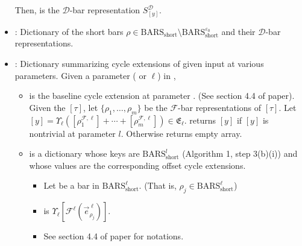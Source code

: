 \documentclass{article}
\begin{document}
\begin{itemize}
Then,  is the $\mathcal{D}$-bar representation $S^{\mathcal{D}}_{[y]}$.
\item {}: Dictionary of the short bars $\rho \in \text{BARS}_{\text{short}} \setminus \text{BARS}_{\text{short}}^{\varepsilon_0}$ and their $\mathcal{D}$-bar representations.
\item {}: Dictionary summarizing cycle extensions of given input at various parameters.  Given a parameter  ( or $\ell$) in , 

	\begin{itemize}
	\item {} is the baseline cycle extension at parameter . (See section 4.4 of paper). Given the  $[\tau]$, let $\{ \rho_1, \dots, \rho_m \}$ be the $\mathcal{F}$-bar representations of $[\tau]$. Let $[y] = \Upsilon_{\ell}([\rho_1^{\mathcal{F}, \ell}] + \cdots + [\rho_m^{\mathcal{F}, \ell}]) \in \mathfrak{E}_{\ell}$.  returns $[y]$ if $[y]$ is nontrivial at parameter $l$. Otherwise returns empty array.
	\item {} is a dictionary whose keys are $\text{BARS}_{\text{short}}^{l}$ (Algorithm 1, step 3(b)(i)) and whose values are the corresponding offset cycle extensions.
	\begin{itemize}
	\item Let   be a bar in $\text{BARS}_{\text{short}}^{\ell}$. (That is, $\rho_j \in \text{BARS}_{\text{short}}^{\ell}$) %
	\item {} is  $\Upsilon_{\ell} [\mathcal{F}^{\ell} (\vec{e}^{\; \ell}_{\rho_j})]$.
	\item See section 4.4 of paper for notations.
	\end{itemize}
	\end{itemize}
	

\end{itemize}
\end{document}
